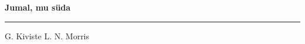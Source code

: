 \documentclass[10pt]{book}
\begin{document}
{
  \samepage
  \raggedbottom
  \raggedright
  \sloppy


  \vspace{0.2in}

  \noindent\begin{minipage}{.1\textwidth}
    \hfill\vspace{0.1in}
  \end{minipage}%
  \noindent\begin{minipage}{.8\textwidth}
    \centering
    \bfseries
    \large Jumal, mu s\"uda
  \end{minipage}%
  \noindent\begin{minipage}{.1\textwidth}
      \hfill\vspace{0.1in}
  \end{minipage}

  \nopagebreak[4]
  \vspace{0.1in}
  \nopagebreak[4]
  \hrule height 0.05ex
  \nopagebreak[4]
  \vspace{-0.05in}

  {\footnotesize G. Kiviste \hfill L. N. Morris }\\
  \vspace{0.01in}



}
\end{document}
